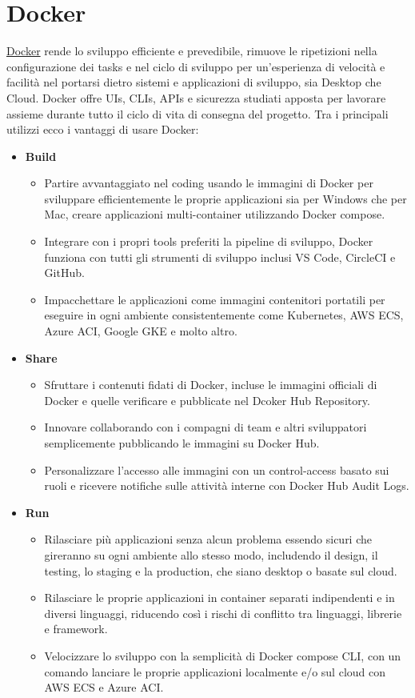 \documentclass[a4paper,12pt]{report}
\newcommand{\docker}{\href{https://www.docker.com/}{Docker} }
\begin{document}
\section{Docker}
\docker rende lo sviluppo efficiente e prevedibile, rimuove le ripetizioni nella configurazione dei tasks e nel ciclo di sviluppo per un'esperienza di velocità e facilità nel portarsi dietro sistemi e applicazioni di sviluppo, sia Desktop che Cloud. Docker offre UIs, CLIs, APIs e sicurezza studiati apposta per lavorare assieme durante tutto il ciclo di vita di consegna del progetto. Tra i principali utilizzi ecco i vantaggi di usare Docker:
\begin{itemize}
	\item \textbf{Build}
	\begin{itemize}
		\item Partire avvantaggiato nel coding usando le immagini di Docker per sviluppare efficientemente le proprie applicazioni sia per Windows che per Mac, creare applicazioni multi-container utilizzando Docker compose.
		\item Integrare con i propri tools preferiti la pipeline di sviluppo, Docker funziona con tutti gli strumenti di sviluppo inclusi VS Code, CircleCI e GitHub.
		\item Impacchettare le applicazioni come immagini contenitori portatili per eseguire in ogni ambiente consistentemente come Kubernetes, AWS ECS, Azure ACI, Google GKE e molto altro.
	\end{itemize}
	\item \textbf{Share}
	\begin{itemize}
		\item Sfruttare i contenuti fidati di Docker, incluse le immagini officiali di Docker e quelle verificare e pubblicate nel Dcoker Hub Repository.
		\item Innovare collaborando con i compagni di team e altri sviluppatori semplicemente pubblicando le immagini su Docker Hub.
		\item Personalizzare l'accesso alle immagini con un control-access basato sui ruoli e ricevere notifiche sulle attività interne con Docker Hub Audit Logs.
	\end{itemize}
	\item \textbf{Run}
	\begin{itemize}
		\item Rilasciare più applicazioni senza alcun problema essendo sicuri che gireranno su ogni ambiente allo stesso modo, includendo il design, il testing, lo staging e la production, che siano desktop o basate sul cloud.
		\item Rilasciare le proprie applicazioni in container separati indipendenti e in diversi linguaggi, riducendo così i rischi di conflitto tra linguaggi, librerie e framework.
		\item Velocizzare lo sviluppo con la semplicità di Docker compose CLI, con un comando lanciare le proprie applicazioni localmente e/o sul cloud con AWS ECS e Azure ACI.
	\end{itemize}
\end{itemize}
\end{document}
